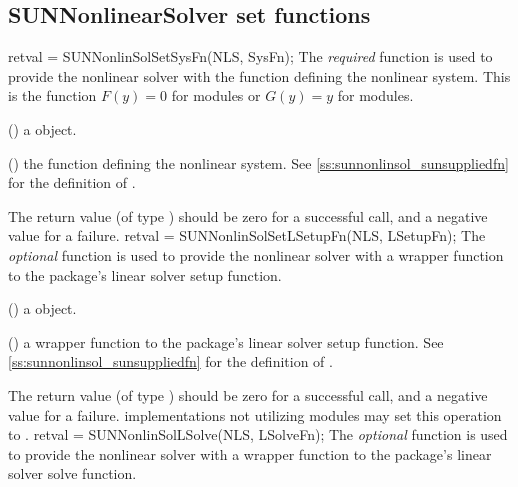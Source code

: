 \subsection{SUNNonlinearSolver set functions}
\label{ss:sunnonlinsol_setfn}
{
  retval = SUNNonlinSolSetSysFn(NLS, SysFn);
}
{
  The \textit{required} function  is used
  to provide the nonlinear solver with the function defining the
  nonlinear system. This is the function $F(y)=0$ for
   modules or $G(y)=y$ for
   modules.
}
{
  \begin{args}[SysFn]
  \item[NLS] ()
    a {\sunnonlinsol} object.
  \item[SysFn] ()
    the function defining the nonlinear system. See
    \ref{ss:sunnonlinsol_sunsuppliedfn} for the definition of
    .
  \end{args}
}
{
  The return value  (of type ) should be zero for a
  successful call, and a negative value for a failure.
}
{}
{
  retval = SUNNonlinSolSetLSetupFn(NLS, LSetupFn);
}
{
  The \textit{optional} function  is used to
  provide the nonlinear solver with a wrapper function to the
  {\sundials} package's linear solver setup function.
}
{
  \begin{args}[LSetupFn]
  \item[NLS] ()
    a {\sunnonlinsol} object.
  \item[LSetupFn] ()
    a wrapper function to the {\sundials} package's linear solver
    setup function. See \ref{ss:sunnonlinsol_sunsuppliedfn} for the
    definition of .
  \end{args}
}
{
  The return value  (of type ) should be zero for a
  successful call, and a negative value for a failure.
}
{
  {\sunnonlinsol} implementations not utilizing {\sunlinsol} modules
  may set this operation to .
}
{
  retval = SUNNonlinSolLSolve(NLS, LSolveFn);
}
{
  The \textit{optional} function  is used to
  provide the nonlinear solver with a wrapper function to the
  {\sundials} package's linear solver solve function.
}
